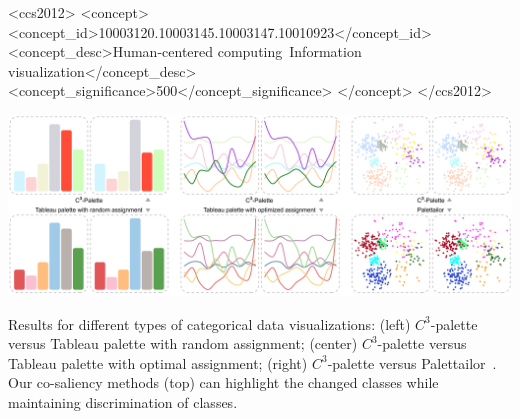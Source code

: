 \documentclass[manuscript,screen,review]{acmart}
\begin{document}
\begin{CCSXML}
<ccs2012>
<concept>
<concept_id>10003120.10003145.10003147.10010923</concept_id>
<concept_desc>Human-centered computing~Information visualization</concept_desc>
<concept_significance>500</concept_significance>
</concept>
</ccs2012>
\end{CCSXML}



\begin{teaserfigure}
  \includegraphics[width=\textwidth]{teaser7}
  \caption{
  Results for different types of categorical data visualizations: (left) $C^3$-palette versus Tableau palette with random assignment; (center) $C^3$-palette  versus
Tableau palette with optimal assignment; (right) $C^3$-palette versus Palettailor~\cite{Lu21}. Our co-saliency methods (top) can highlight the changed classes while
maintaining discrimination of classes.}
  \label{fig:teaser}
\end{teaserfigure}

\maketitle





%







\end{document}
